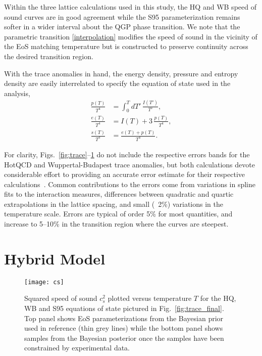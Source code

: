 \documentclass[aps,prc,reprint,amsmath,nofootinbib,superscriptaddress]{revtex4-1}
\begin{document}
Within the three lattice calculations used in this study, the HQ and WB speed of sound curves are in good agreement while the S95 parameterization remains softer in a wider interval about the QGP phase transition. We note that the parametric transition \eqref{interpolation} modifies the speed of sound in the vicinity of the EoS matching temperature but is constructed to preserve continuity across the desired transition region.

With the trace anomalies in hand, the energy density, pressure and entropy density are easily interrelated to specify the equation of state used in the analysis,
\begin{align}
 \label{conversion}
 \frac{p(T)}{T^4} &= \int_0^T dT'\, \frac{I(T')}{T'}, \\
 \frac{e(T)}{T^4} &= I(T) + 3\, \frac{p(T)}{T^4}, \\
 \frac{s(T)}{T^3} &= \frac{e(T) + p(T)}{T^4}. 
\end{align}
 
For clarity, Figs.~\ref{fig:trace}--\ref{fig:cs} do not include the respective errors bands for the HotQCD and Wuppertal-Budapest trace anomalies, but both calculations devote considerable effort to providing an accurate error estimate for their respective calculations~\cite{Borsanyi:2013bia,Bazavov:2014pvz}.  Common contributions to the errors
come from variations in spline fits to the interaction measures, differences between quadratic and quartic extrapolations in the lattice spacing, and
small (~2\%) variations in the temperature scale.  Errors are typical of order 5\% for most quantities, and increase to 5--10\% in the transition region
where the curves are steepest.

\section{Hybrid Model}

\begin{figure}[b]
  \texttt{[image: cs]}
  \caption{\label{fig:cs} Squared speed of sound $c_s^2$ plotted versus temperature $T$ for the HQ, WB and S95 equations of state pictured in 
           Fig.~\ref{fig:trace_final}. Top panel shows EoS parameterizations from the Bayesian prior used in reference \cite{Pratt:2015zsa} (thin grey lines)
           while the bottom panel shows samples from the Bayesian posterior once the samples have been constrained by experimental data.
          }
\end{figure}
\end{document}
